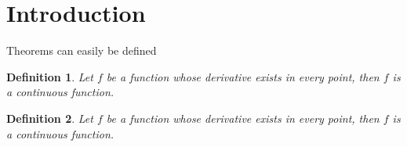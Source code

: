 \documentclass{article}
\newtheorem{definition}{Definition}
\begin{document}
\section{Introduction}
Theorems can easily be defined

\begin{definition}
	\label{def:label1}
	Let $f$ be a function whose derivative exists in every point, then $f$ is a continuous function.
\end{definition}
 
\begin{definition}
	\label{def:label2}
	Let $f$ be a function whose derivative exists in every point, then $f$ is a continuous function.
\end{definition}


\end{document}
